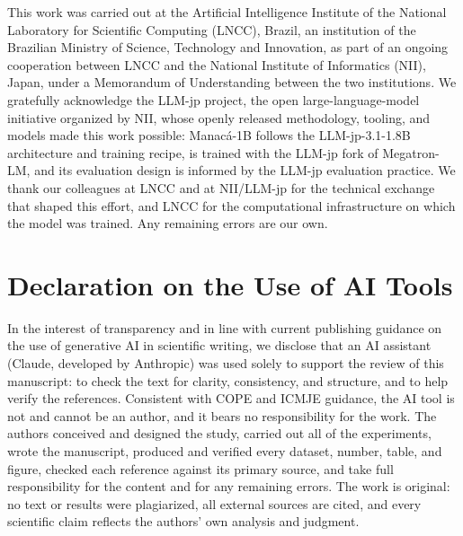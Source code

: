 \documentclass[11pt]{article}
\begin{document}
This work was carried out at the Artificial Intelligence Institute of the National
Laboratory for Scientific Computing (LNCC), Brazil, an institution of the Brazilian
Ministry of Science, Technology and Innovation, as part of an ongoing cooperation
between LNCC and the National Institute of Informatics (NII), Japan, under a
Memorandum of Understanding between the two institutions. We gratefully acknowledge
the LLM-jp project, the open large-language-model initiative organized by NII, whose
openly released methodology, tooling, and models made this work possible: Manac\'a-1B
follows the LLM-jp-3.1-1.8B architecture and training recipe, is trained with the
LLM-jp fork of Megatron-LM, and its evaluation design is informed by the LLM-jp
evaluation practice. We thank our colleagues at LNCC and at NII/LLM-jp for the
technical exchange that shaped this effort, and LNCC for the computational
infrastructure on which the model was trained. Any remaining errors are our own.

\section*{Declaration on the Use of AI Tools}

In the interest of transparency and in line with current publishing guidance on the
use of generative AI in scientific writing, we disclose that an AI assistant (Claude,
developed by Anthropic) was used solely to support the review of this manuscript: to
check the text for clarity, consistency, and structure, and to help verify the
references. Consistent with COPE and ICMJE guidance, the AI tool is not and cannot be
an author, and it bears no responsibility for the work. The authors conceived and
designed the study, carried out all of the experiments, wrote the manuscript, produced
and verified every dataset, number, table, and figure, checked each reference against
its primary source, and take full responsibility for the content and for any remaining
errors. The work is original: no text or results were plagiarized, all external sources
are cited, and every scientific claim reflects the authors' own analysis and judgment.
\end{document}
